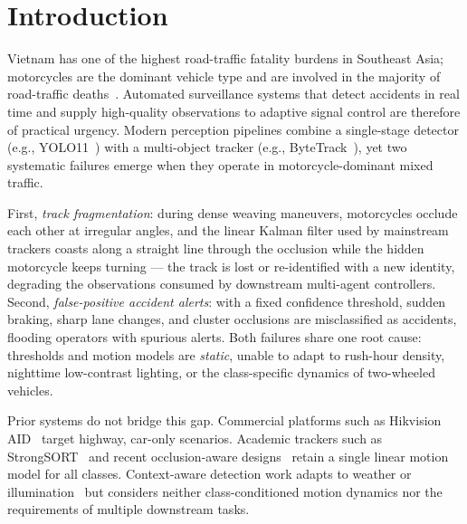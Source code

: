 
\section{Introduction}
\label{sec:intro}

Vietnam has one of the highest road-traffic fatality burdens in
Southeast Asia; motorcycles are the dominant vehicle type and are
involved in the majority of road-traffic
deaths~\cite{WHO2023_roadsafety}.
Automated surveillance systems that detect accidents in real time and
supply high-quality observations to adaptive signal control are
therefore of practical urgency.
Modern perception pipelines combine a single-stage detector (e.g.,
YOLO11~\cite{Khanam2024_yolo11}) with a multi-object tracker (e.g.,
ByteTrack~\cite{Zhang2022_bytetrack}), yet two systematic failures
emerge when they operate in motorcycle-dominant mixed traffic.

First, \emph{track fragmentation}: during dense weaving maneuvers,
motorcycles occlude each other at irregular angles, and the linear
Kalman filter used by mainstream trackers coasts along a straight line
through the occlusion while the hidden motorcycle keeps turning --- the
track is lost or re-identified with a new identity, degrading the
observations consumed by downstream multi-agent controllers.
Second, \emph{false-positive accident alerts}: with a fixed confidence
threshold, sudden braking, sharp lane changes, and cluster occlusions
are misclassified as accidents, flooding operators with spurious
alerts.
Both failures share one root cause: thresholds and motion models are
\emph{static}, unable to adapt to rush-hour density, nighttime
low-contrast lighting, or the class-specific dynamics of two-wheeled
vehicles.

Prior systems do not bridge this gap.
Commercial platforms such as Hikvision AID~\cite{Hikvision_AID} target
highway, car-only scenarios.
Academic trackers such as StrongSORT~\cite{Du2023_strongsort} and
recent occlusion-aware designs~\cite{Hashempoor2025_fasttracker} retain
a single linear motion model for all classes.
Context-aware detection work adapts to weather or
illumination~\cite{Liu2022_iayolo} but considers neither
class-conditioned motion dynamics nor the requirements of multiple
downstream tasks.

